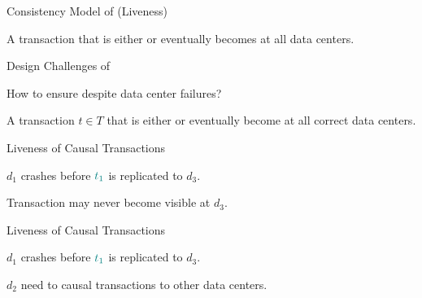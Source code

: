 \begin{frame}{Consistency Model of \unistore{} (Liveness)}
  \ev

  \vspace{0.50cm}
  A transaction that is either 
  or 
  eventually becomes  at all  data centers.
\end{frame}

\begin{frame}{Design Challenges of \unistore}
  \begin{center}
    {How to ensure  despite data center failures?}

    \vspace{0.50cm}
    A transaction $t \in T$ that is either 
    or 
    eventually become  at all correct data centers.
  \end{center}
\end{frame}

\begin{frame}{Liveness of Causal Transactions}
  \begin{center}
    $d_{1}$ crashes before $\textcolor{teal}{t_{1}}$ is replicated to $d_{3}$.

    \vspace{0.20cm}

    \pause
    Transaction  may never become visible at $d_{3}$.
  \end{center}
\end{frame}

\begin{frame}{Liveness of Causal Transactions}
  \begin{center}
    $d_{1}$ crashes before $\textcolor{teal}{t_{1}}$ is replicated to $d_{3}$.

    \vspace{0.20cm}

    \pause
    $d_{2}$ need to  causal transactions to other data centers.
  \end{center}
\end{frame}

